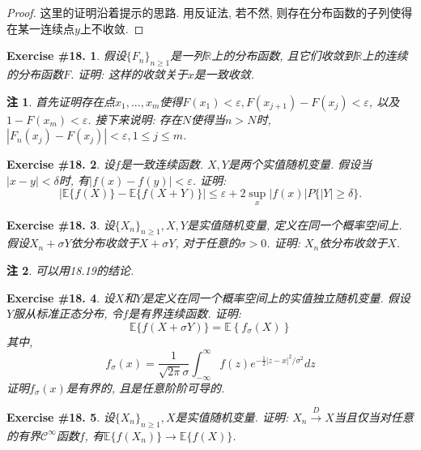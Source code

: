 \documentclass[UTF8, a4paper]{article}
\newtheorem{exercise}{Exercise \#18.}
\newtheorem*{remark}{注}
\begin{document}
\begin{proof}
这里的证明沿着提示的思路. 用反证法, 若不然, 则存在分布函数的子列使得在某一连续点\(y\)上不收敛.

\end{proof}






\begin{exercise}
假设\(\{F_n\}_{n\geq 1}\)是一列\(\mathbb{R}\)上的分布函数, 且它们收敛到\(\mathbb{R}\)上的连续的分布函数\(F\).
证明: 这样的收敛关于\(x\)是一致收敛.
\end{exercise}





\begin{remark}
首先证明存在点\(x_1, ..., x_m\)使得\(F(x_1) < \varepsilon, F(x_{j+1}) - F(x_{j}) < \varepsilon\), 以及\(1 - F(x_m) < \varepsilon\).
接下来说明: 存在\(N\)使得当\(n>N\)时, \(|F_n(x_j) - F(x_j)| < \varepsilon, 1 \leq j \leq m\).
\end{remark}


\begin{exercise}
设\(f\)是一致连续函数. \(X,Y\)是两个实值随机变量.
假设当\(|x-y| < \delta\)时, 有\(|f(x) - f(y)| < \varepsilon\). 证明:
$$
|\mathbb{E}\{f(X)\}-\mathbb{E}\{f(X+Y)\}| \leq \varepsilon+2 \sup _x|f(x)| P\{|Y| \geq \delta\} .
$$
\end{exercise}


\begin{exercise}
设\(\{X_n\}_{n \geq 1}, X, Y\)是实值随机变量, 定义在同一个概率空间上.
假设\(X_n + \sigma Y\)依分布收敛于\(X + \sigma Y\), 对于任意的\(\sigma > 0\).
证明: \(X_n\)依分布收敛于\(X\).
\end{exercise}
\begin{remark}
可以用18.19的结论.
\end{remark}


\begin{exercise}
设\(X\)和\(Y\)是定义在同一个概率空间上的实值独立随机变量. 
假设\(Y\)服从标准正态分布, 令\(f\)是有界连续函数. 证明:
$$
\mathbb{E}\{f(X+\sigma Y)\}=\mathbb{E}\left\{f_\sigma(X)\right\}
$$
其中, 
$$
f_\sigma(x)=\frac{1}{\sqrt{2 \pi} \sigma} \int_{-\infty}^{\infty} f(z) e^{-\frac{1}{2}|z-x|^2 / \sigma^2} d z
$$
证明\(f_\sigma(x)\)是有界的, 且是任意阶阶可导的.
\end{exercise}



\begin{exercise}
设\(\{X_n\}_{n\geq 1}, X\)是实值随机变量. 证明: \(X_n \xrightarrow{D}X\)当且仅当对任意的有界\(\mathcal{C}^\infty\)函数\(f\), 有\(\mathbb{E}\{f(X_n)\} \to \mathbb{E}\{f(X)\}\).
\end{exercise}











\end{document}
